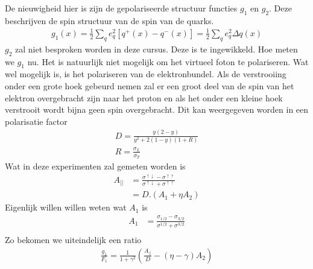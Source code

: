 \documentclass[../main.tex]{subfiles}
\begin{document}
De nieuwigheid hier is zijn de gepolariseerde structuur functies $g_1$ en $g_2$. Deze beschrijven de spin structuur van de spin van de quarks.
\begin{equation}
    \begin{aligned}
        \label{eq:g_1_pol}
        g_1(x)=\frac{1}{2} \sum_q e_q^2[q^+(x)-q^-(x)] = \frac{1}{2} \sum_q e_q^2 \Delta q(x)
    \end{aligned}
\end{equation}
$g_2$ zal niet besproken worden in deze cursus. Deze is te ingewikkeld. Hoe meten we $g_1$ nu. Het is natuurlijk niet mogelijk om het virtueel foton te polariseren. Wat wel mogelijk is, is het polariseren van de elektronbundel. Als de verstrooiing onder een grote hoek gebeurd nemen zal er een groot deel van de spin van het elektron overgebracht zijn naar het proton en als het onder een kleine hoek verstrooit wordt bijna geen spin overgebracht. Dit kan weergegeven worden in een polarisatie factor
\begin{equation}
    \begin{aligned}
        \label{eq:pol_factor}
        D= \frac{y(2-y)}{y^2 + 2(1-y)(1+R)}\\
        R= \frac{\sigma_L}{\sigma_T} 
    \end{aligned}
\end{equation}
Wat in deze experimenten zal gemeten worden is
\begin{equation}
    \begin{aligned}
        \label{eq:a_parallel}
        A_{||} &= \frac{\sigma^{\uparrow\downarrow} - \sigma^{\uparrow\uparrow}}{\sigma^{\uparrow\downarrow} + \sigma^{\uparrow\uparrow}}\\
               &= D.(A_1+\eta A_2)
    \end{aligned}
\end{equation}
Eigenlijk willen willen weten wat $A_1$ is
\begin{equation}
    \begin{aligned}
        \label{eq:a_parallel}
        A_{1} &= \frac{\sigma_{1/2} - \sigma_{3/2}}{\sigma^{1/2} + \sigma^{3/2}}\\
    \end{aligned}
\end{equation}
Zo bekomen we uiteindelijk een ratio
\begin{equation}
    \begin{aligned}
        \label{eq:pol_ratio_struct_func}
        \frac{g_1}{F_1} = \frac{1}{1+\gamma^2} \left( \frac{A_{||}}{D} - (\eta - \gamma)A_2\right)
    \end{aligned}
\end{equation}
\end{document}
